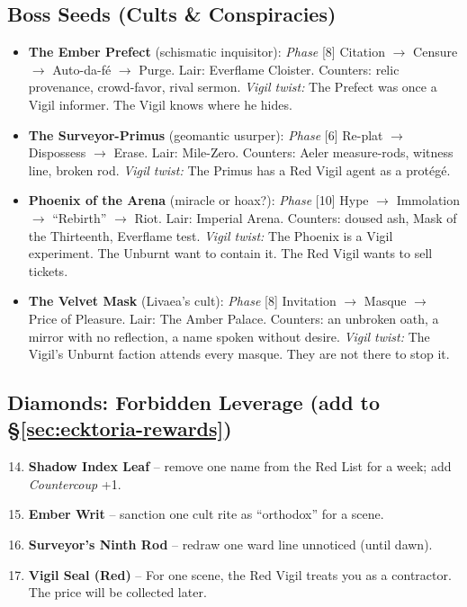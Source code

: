 \subsection*{Boss Seeds (Cults \& Conspiracies)}
\begin{itemize}
  \item \textbf{The Ember Prefect} (schismatic inquisitor): \emph{Phase} [8] Citation $\rightarrow$ Censure $\rightarrow$ Auto-da-fé $\rightarrow$ Purge. Lair: Everflame Cloister. Counters: relic provenance, crowd-favor, rival sermon. \emph{Vigil twist:} The Prefect was once a Vigil informer. The Vigil knows where he hides.
  \item \textbf{The Surveyor-Primus} (geomantic usurper): \emph{Phase} [6] Re-plat $\rightarrow$ Dispossess $\rightarrow$ Erase. Lair: Mile-Zero. Counters: Aeler measure-rods, witness line, broken rod. \emph{Vigil twist:} The Primus has a Red Vigil agent as a protégé.
  \item \textbf{Phoenix of the Arena} (miracle or hoax?): \emph{Phase} [10] Hype $\rightarrow$ Immolation $\rightarrow$ ``Rebirth'' $\rightarrow$ Riot. Lair: Imperial Arena. Counters: doused ash, Mask of the Thirteenth, Everflame test. \emph{Vigil twist:} The Phoenix is a Vigil experiment. The Unburnt want to contain it. The Red Vigil wants to sell tickets.
  \item \textbf{The Velvet Mask} (Livaea's cult): \emph{Phase} [8] Invitation $\rightarrow$ Masque $\rightarrow$ Price of Pleasure. Lair: The Amber Palace. Counters: an unbroken oath, a mirror with no reflection, a name spoken without desire. \emph{Vigil twist:} The Vigil's Unburnt faction attends every masque. They are not there to stop it.
\end{itemize}

\subsection*{Diamonds: Forbidden Leverage (add to \S\ref{sec:ecktoria-rewards})}
\begin{enumerate}
\setcounter{enumi}{13}
  \item \textbf{Shadow Index Leaf} -- remove one name from the Red List for a week; add \emph{Countercoup} +1.
  \item \textbf{Ember Writ} -- sanction one cult rite as ``orthodox'' for a scene.
  \item \textbf{Surveyor's Ninth Rod} -- redraw one ward line unnoticed (until dawn).
  \item \textbf{Vigil Seal (Red)} -- For one scene, the Red Vigil treats you as a contractor. The price will be collected later.
\end{enumerate}

